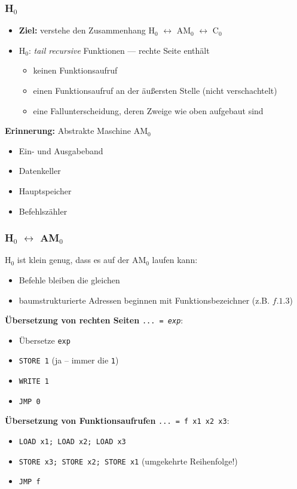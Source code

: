 \documentclass{beamer}
\begin{document}
\begin{frame} \frametitle{H${}_\text{0}$}
	\footnotesize
	\begin{itemize}
		\item \textbf{Ziel:} verstehe den Zusammenhang H${}_\text{0}$ $\leftrightarrow$ AM${}_\text{0}$ \textcolor{cdgray}{$\leftrightarrow$ C${}_\text{0}$}
		\item H${}_\text{0}$: \textit{tail recursive} Funktionen --- rechte Seite enthält
		\begin{itemize} \footnotesize
			\item keinen Funktionsaufruf
			\item einen Funktionsaufruf an der äußersten Stelle (nicht verschachtelt)
			\item eine Fallunterscheidung, deren Zweige wie oben aufgebaut sind
		\end{itemize}
	\end{itemize}

	\textbf{Erinnerung:} Abstrakte Maschine AM${}_0$
	\begin{itemize}
		\item Ein- und Ausgabeband
		\item Datenkeller
		\item Hauptspeicher 
		\item Befehlszähler
	\end{itemize}
\end{frame}

\begin{frame} \frametitle{H${}_\text{0}$ $\leftrightarrow$ AM${}_\text{0}$}
	\footnotesize
	H${}_\text{0}$ ist klein genug, dass es auf der AM${}_\text{0}$ laufen kann:
	\begin{itemize}
		\item Befehle bleiben die gleichen
		\item baumstrukturierte Adressen beginnen mit Funktionsbezeichner (z.B. $f.1.3$)
	\end{itemize}
	
	\textbf{Übersetzung von rechten Seiten} \texttt{... = \textit{exp}}: 
	\begin{itemize}
		\item Übersetze \texttt{exp}
		\item \texttt{STORE 1} \hspace{2em} (ja -- immer die \texttt{1})
		\item \texttt{WRITE 1}
		\item \texttt{JMP 0}
	\end{itemize}

	\medskip
	\textbf{Übersetzung von Funktionsaufrufen} \texttt{... = f x1 x2 x3}:
	\begin{itemize}
		\item \texttt{LOAD x1; LOAD x2; LOAD x3}
		\item \texttt{STORE x3; STORE x2; STORE x1} {\footnotesize(umgekehrte Reihenfolge!)}
		\item \texttt{JMP f}
	\end{itemize}
\end{frame}
\end{document}

